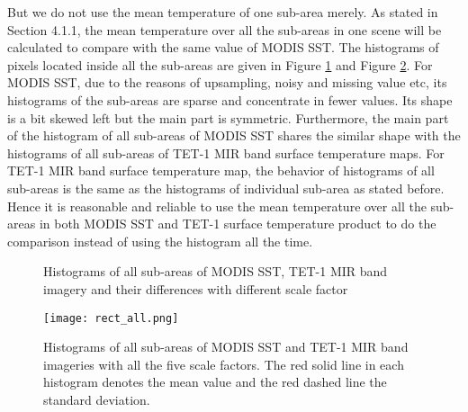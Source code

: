 \noindent But we do not use the mean temperature of one sub-area merely. As stated in Section 4.1.1, the mean temperature over all the sub-areas in one scene will be calculated to compare with the same value of MODIS SST. The histograms of pixels located inside all the sub-areas are given in Figure \ref{fig:hist_all_rect} and Figure \ref{fig:rect_all_sc_all}. For MODIS SST, due to the reasons of upsampling, noisy and missing value etc, its histograms of the sub-areas are sparse and concentrate in fewer values. Its shape is a bit skewed left but the main part is symmetric. Furthermore, the main part of the histogram of all sub-areas of MODIS SST shares the similar shape with the histograms of all sub-areas of TET-1 MIR band surface temperature maps. For TET-1 MIR band surface temperature map, the behavior of histograms of all sub-areas is the same as the histograms of individual sub-area as stated before. Hence it is reasonable and reliable to use the mean temperature over all the sub-areas in both MODIS SST and TET-1 surface temperature product to do the comparison instead of using the histogram all the time.\\

\begin{figure}[!htbp]
\centering
{}
\vspace{0.1in}
\caption{Histograms of all sub-areas of MODIS SST, TET-1 MIR band imagery and their differences with different scale factor}
\label{fig:hist_all_rect}
\end{figure}

\begin{figure}[!htbp]
\centering
\texttt{[image: rect\_all.png]}
\caption{Histograms of all sub-areas of MODIS SST and TET-1 MIR band imageries with all the five scale factors. The red solid line in each histogram denotes the mean value and the red dashed line the standard deviation.}
\label{fig:rect_all_sc_all}
\end{figure}

